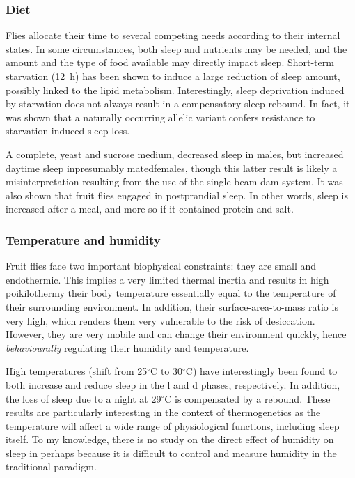 \subsubsection{Diet}
Flies allocate their time to several competing needs according to their internal states. 
In some circumstances, both sleep and nutrients may be needed, and the amount and the type of food available may directly impact sleep.
Short-term starvation (12~h) has been shown to induce a large reduction of sleep amount\cite{keene_clock_2010}, possibly linked to the lipid metabolism\cite{thimgan_perilipin_2010}. 
Interestingly, sleep deprivation induced by starvation does not always result in a compensatory sleep rebound. 
In fact, it was shown that a naturally occurring allelic variant confers resistance to starvation-induced sleep loss\cite{donlea_foraging_2012}.

A complete, yeast and sucrose medium, decreased sleep in males, but increased daytime sleep in\emd{}presumably mated\emd{}females\cite{catterson_dietary_2010}, though this latter result is likely a misinterpretation resulting from the use of the single-beam \gls{dam} system\cite{garbe_changes_2016}.
It was also shown that fruit flies engaged in postprandial sleep. 
In other words, sleep is increased after a meal, and more so if it contained protein and salt\cite{murphy_postprandial_2016,murphy_simultaneous_2017}.


\subsubsection{Temperature and humidity}
Fruit flies face two important biophysical constraints: they are small and endothermic.
This implies a very limited thermal inertia and results in high poikilothermy\emd{}\ie{} their body temperature essentially equal to the temperature of their surrounding environment\cite{heinrich_insect_1995}.
In addition, their surface-area-to-mass ratio is very high, which renders them very vulnerable to the risk of desiccation\cite{prince_adaptive_1977}.
However, they are very mobile and can change their environment quickly, hence \emph{behaviourally} regulating their humidity and temperature\cite{klein_sensory_2015}.

High temperatures (shift from 25$^{\circ}$C to 30$^{\circ}$C) have interestingly been found to both increase and reduce sleep in the \gls{l} and \gls{d} phases, respectively\cite{shih_statistical_2011,ishimoto_factors_2012,parisky_reorganization_2016}.
In addition, the loss of sleep due to a night at 29$^{\circ}$C is compensated by a rebound\cite{parisky_reorganization_2016}.
These results are particularly interesting in the context of thermogenetics as the temperature will affect a wide range of physiological functions, including sleep itself. To my knowledge, there is no study on the direct effect of humidity on sleep in \droso\emd{}perhaps because it is difficult to control and measure humidity in the traditional paradigm.

